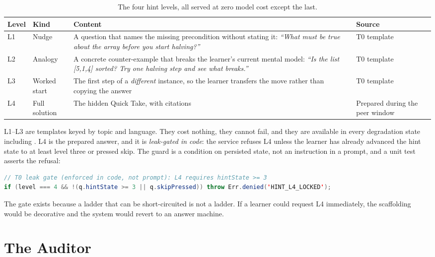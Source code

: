 \begin{table}[htbp]
\centering
\caption{The four hint levels, all served at zero model cost except the last.}
\label{tab:ladder}
\footnotesize
\begin{tabularx}{\textwidth}{@{}p{1.0cm}p{2.5cm}X p{3.3cm}@{}}
\toprule
\textbf{Level} & \textbf{Kind} & \textbf{Content} & \textbf{Source} \\
\midrule
L1 & Nudge & A question that names the missing precondition without stating it:
   \emph{``What must be true about the array before you start halving?''} & T0 template \\
L2 & Analogy & A concrete counter-example that breaks the learner's current mental model:
   \emph{``Is the list [5,1,4] sorted? Try one halving step and see what breaks.''}
   & T0 template \\
L3 & Worked start & The first step of a \emph{different} instance, so the learner
   transfers the move rather than copying the answer & T0 template \\
L4 & Full solution & The hidden Quick Take, with citations & Prepared during the peer
   window \\
\bottomrule
\end{tabularx}
\end{table}

L1--L3 are templates keyed by topic and language. They cost nothing, they cannot fail, and
they are available in every degradation state including . L4 is the prepared
answer, and it is \emph{leak-gated in code}: the service refuses L4 unless the learner has
already advanced the hint state to at least level three or pressed skip. The guard is a
condition on persisted state, not an instruction in a prompt, and a unit test asserts the
refusal:

\begin{lstlisting}[language=Java,caption={The L4 leak gate. A prompt-only instruction would be advisory; this is not.}]
// T0 leak gate (enforced in code, not prompt): L4 requires hintState >= 3
if (level === 4 && !(q.hintState >= 3 || q.skipPressed)) throw Err.denied('HINT_L4_LOCKED');
\end{lstlisting}

The gate exists because a ladder that can be short-circuited is not a ladder. If a learner
could request L4 immediately, the scaffolding would be decorative and the system would
revert to an answer machine.

\section{The Auditor}
\label{sec:auditor}

